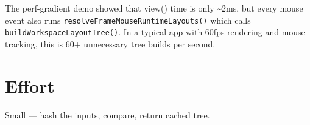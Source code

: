 The perf-gradient demo showed that view() time is only \textasciitilde2ms, but every mouse event also runs \texttt{r\allowbreak{}e\allowbreak{}s\allowbreak{}o\allowbreak{}l\allowbreak{}v\allowbreak{}e\allowbreak{}F\allowbreak{}r\allowbreak{}a\allowbreak{}m\allowbreak{}e\allowbreak{}M\allowbreak{}o\allowbreak{}u\allowbreak{}s\allowbreak{}e\allowbreak{}R\allowbreak{}u\allowbreak{}n\allowbreak{}t\allowbreak{}i\allowbreak{}m\allowbreak{}e\allowbreak{}L\allowbreak{}a\allowbreak{}y\allowbreak{}o\allowbreak{}u\allowbreak{}t\allowbreak{}s\allowbreak{}(\allowbreak{})} which calls \texttt{b\allowbreak{}u\allowbreak{}i\allowbreak{}l\allowbreak{}d\allowbreak{}W\allowbreak{}o\allowbreak{}r\allowbreak{}k\allowbreak{}s\allowbreak{}p\allowbreak{}a\allowbreak{}c\allowbreak{}e\allowbreak{}L\allowbreak{}a\allowbreak{}y\allowbreak{}o\allowbreak{}u\allowbreak{}t\allowbreak{}T\allowbreak{}r\allowbreak{}e\allowbreak{}e\allowbreak{}(\allowbreak{})}. In a typical app with 60fps rendering and mouse tracking, this is 60+ unnecessary tree builds per second.

\section{Effort}\label{record-364-effort}

Small --- hash the inputs, compare, return cached tree.


